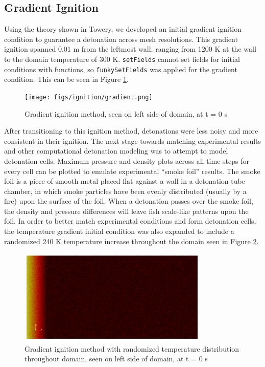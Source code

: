 \subsection{Gradient Ignition}
Using the theory shown in Towery\cite{towery2}, we developed an initial gradient ignition condition to guarantee a detonation across mesh resolutions. This gradient ignition spanned 0.01 m from the leftmost wall, ranging from 1200 K at the wall to the domain temperature of 300 K. \verb|setFields| cannot set fields for initial conditions with functions, so \verb|funkySetFields| was applied for the gradient condition. This can be seen in Figure \ref{fig:gradig}. 
\begin{figure}[h]
\centering
\texttt{[image: figs/ignition/gradient.png]}
\caption{Gradient ignition method, seen on left side of domain, at t = 0 s}
\label{fig:gradig}
\end{figure}%
\noindent After transitioning to this ignition method, detonations were less noisy and more consistent in their ignition. The next stage towards matching experimental results and other computational detonation modeling was to attempt to model detonation cells. Maximum pressure and density plots across all time steps for every cell can be plotted to emulate experimental ``smoke foil'' results. The smoke foil is a piece of smooth metal placed flat against a wall in a detonation tube chamber, in which smoke particles have been evenly distributed (usually by a fire) upon the surface of the foil. When a detonation passes over the smoke foil, the density and pressure differences will leave fish scale-like patterns upon the foil. 
In order to better match experimental conditions and form detonation cells, the temperature gradient initial condition was also expanded to include a randomized 240 K temperature increase throughout the domain seen in Figure \ref{fig:gradrand}. 
\begin{figure}[h]
\centering
\includegraphics[width=0.8\textwidth]{figs/ignition/randgrad.png}
\caption{Gradient ignition method with randomized temperature distribution throughout domain, seen on left side of domain, at t = 0 s}
\label{fig:gradrand}
\end{figure}%
